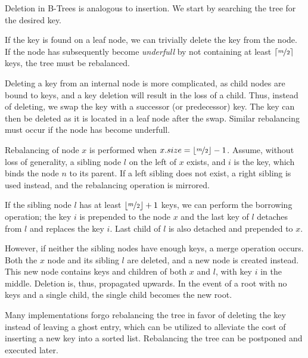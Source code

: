 Deletion in B-Trees is analogous to insertion. We start by searching the tree for the desired key.

If the key is found on a leaf node, we can trivially delete the key from the node. If the node has subsequently become \textit{underfull} by not containing at least $\lceil\nicefrac{m}{2}\rceil$ keys, the tree must be rebalanced.

Deleting a key from an internal node is more complicated, as child nodes are bound to keys, and a key deletion will result in the loss of a child. Thus, instead of deleting, we swap the key with a successor (or predecessor) key. The key can then be deleted as it is located in a leaf node after the swap. Similar rebalancing must occur if the node has become underfull.

Rebalancing of node $x$ is performed when $x.size = \lfloor\nicefrac{m}{2}\rfloor - 1$. Assume, without loss of generality, a sibling node $l$ on the left of $x$ exists, and $i$ is the key, which binds the node $n$ to its parent. If a left sibling does not exist, a right sibling is used instead, and the rebalancing operation is mirrored.

If the sibling node $l$ has at least $\lfloor\nicefrac{m}{2}\rfloor + 1$ keys, we can perform the borrowing operation; the key $i$ is prepended to the node $x$ and the last key of $l$ detaches from $l$ and replaces the key $i$. Last child of $l$ is also detached and prepended to $x$.

However, if neither the sibling nodes have enough keys, a merge operation occurs. Both the $x$ node and its sibling $l$ are deleted, and a new node is created instead. This new node contains keys and children of both $x$ and $l$, with key $i$ in the middle. Deletion is, thus, propagated upwards. In the event of a root with no keys and a single child, the single child becomes the new root.

Many implementations forgo rebalancing the tree in favor of deleting the key instead of leaving a ghost entry, which can be utilized to alleviate the cost of inserting a new key into a sorted list. Rebalancing the tree can be postponed and executed later.

